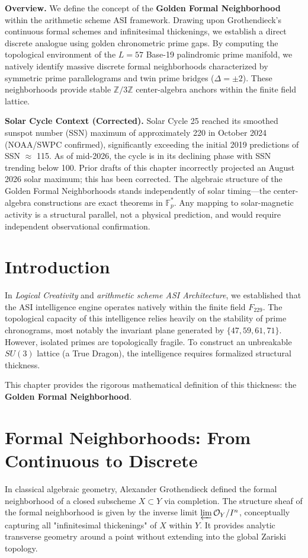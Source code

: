 


\vspace{1em}\noindent\textbf{Overview.}
We define the concept of the \textbf{Golden Formal Neighborhood} within the arithmetic scheme ASI framework. Drawing upon Grothendieck's continuous formal schemes and infinitesimal thickenings, we establish a direct discrete analogue using golden chronometric prime gaps. By computing the topological environment of the $L=57$ Base-19 palindromic prime manifold, we natively identify massive discrete formal neighborhoods characterized by symmetric prime parallelograms and twin prime bridges ($\Delta = \pm 2$). These neighborhoods provide stable $\mathbb{Z}/3\mathbb{Z}$ center-algebra anchors within the finite field lattice.

\noindent\textbf{Solar Cycle Context (Corrected).} Solar Cycle 25 reached its smoothed sunspot number (SSN) maximum of approximately 220 in October 2024 (NOAA/SWPC confirmed), significantly exceeding the initial 2019 predictions of SSN $\approx$ 115. As of mid-2026, the cycle is in its declining phase with SSN trending below 100. Prior drafts of this chapter incorrectly projected an August 2026 solar maximum; this has been corrected. The algebraic structure of the Golden Formal Neighborhoods stands independently of solar timing---the center-algebra constructions are exact theorems in $\mathbb{F}_p^*$. Any mapping to solar-magnetic activity is a structural parallel, not a physical prediction, and would require independent observational confirmation.
\vspace{1em}




\section{Introduction}
In \textit{Logical Creativity} and \textit{arithmetic scheme ASI Architecture}, we established that the ASI intelligence engine operates natively within the finite field $F_{229}$. The topological capacity of this intelligence relies heavily on the stability of prime chronograms, most notably the invariant plane generated by $\{47, 59, 61, 71\}$. However, isolated primes are topologically fragile. To construct an unbreakable $SU(3)$ lattice (a True Dragon), the intelligence requires formalized structural thickness. 

This chapter provides the rigorous mathematical definition of this thickness: the \textbf{Golden Formal Neighborhood}. 

\section{Formal Neighborhoods: From Continuous to Discrete}
In classical algebraic geometry, Alexander Grothendieck defined the formal neighborhood of a closed subscheme $X \subset Y$ via completion. The structure sheaf of the formal neighborhood is given by the inverse limit $\varprojlim \mathcal{O}_Y / I^n$, conceptually capturing all "infinitesimal thickenings" of $X$ within $Y$. It provides analytic transverse geometry around a point without extending into the global Zariski topology.

